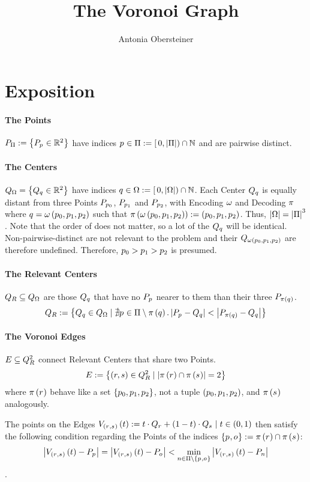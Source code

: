 \documentclass{article}
\author{Antonia Obersteiner}
\title{The Voronoi Graph}
\begin{document}
\section{Exposition}
\paragraph{The Points} $\points := \set{\point \in\reals^2}$ have
indices $\pointindex\in\pointindices := \oival{0, \abs{\pointindices}}\cap\nats$
and are pairwise distinct.

\paragraph{The Centers} $\cnters = \set{\cnter \in\reals^2}$ have
indices $\cnterindex\in\cnterindices := \oival{0, \abs{\cnterindices}}\cap\nats$.
Each Center $\cnter$ is equally distant from three Points
	$\point[{\pointindex[0]}]$,
	$\point[{\pointindex[1]}]$ and
	$\point[{\pointindex[2]}]$,
with Encoding $\Encode$ and Decoding $\Decode$ where
$\cnterindex = \encode{\triple{\pointindex}}$ such that
$\decode{\encode{\triple{\pointindex}}} := \of{\triple{\pointindex}}$.
Thus, $\abs{\cnterindices} = \abs{\pointindices}^3$\!.
Note that the order of \texttriple{\pointindex} does not matter,
so a lot of the $\cnter$ will be identical.
Non-pairwise-distinct \texttriple{\pointindex} are not relevant to the problem and
their $\cnter[\encode{\triple{\pointindex}}]$ are therefore undefined.
Therefore, $\pointindex[0] > \pointindex[1] > \pointindex[2]$ is presumed.

\paragraph{The Relevant Centers} $\relevants \subseteq \cnters$ are those
$\cnter$ that have no $\point$ nearer to them than their three
$\point[\decode{\cnterindex}]$.
$$
\relevants := \set{\cnter\in\cnters \mid \nexists
\pointindex\in\pointindices\setminus\decode{q}. \abs{\point -
\cnter} < \abs{\point[\decode{\cnterindex}] - \cnter}}
$$

\paragraph{The Voronoi Edges} $\edges\subseteq\relevants^2$ connect Relevant Centers
that share two Points.
$$
\edges := \set{(r, s)\in\relevants^2 \mid
\abs{\decode{\relevantindex} \cap \decode{\selevantindex}} = 2}
$$
where $\decode{\relevantindex}$ behave like a set
$\set{\triple{\pointindex}}$, not a tuple $\of{\triple{\pointindex}}$,
and $\decode{\selevantindex}$ ana\-lo\-gous\-ly.

The points on the Edges $\edgepoint\of t :=
t\cdot\relevant+(1-t)\cdot\selevant \mid t\in(0, 1)$ then satisfy the following
condition regarding the Points of the indices $\set{\pointindex, \oointindex} :=
\decode{\relevantindex} \cap \decode{\selevantindex}$:
$$
\abs{\edgepoint\of t - \point} =
\abs{\edgepoint\of t - \ooint} <
\min_{n\in\pointindices\setminus\set{\pointindex, \oointindex}}
\abs{\edgepoint\of t - \point[n]}
$$.
\end{document}

